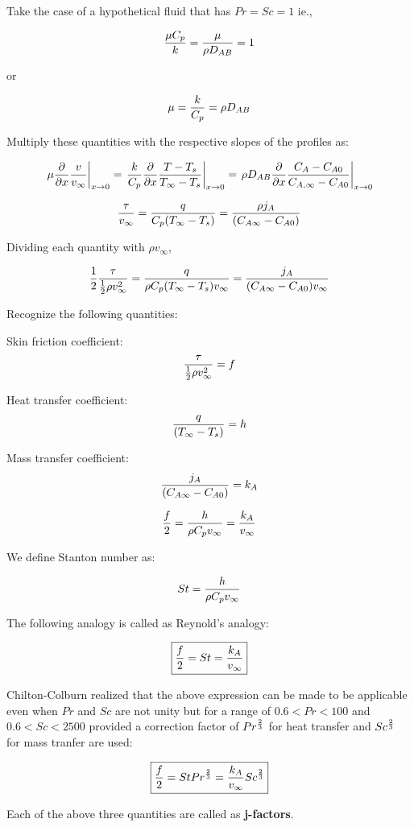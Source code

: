 Take the case of a hypothetical fluid that has $Pr=Sc=1$ ie.,

$$ { \mu C_p \over k} = {\mu \over \rho D_{AB} } = 1$$

or

$$ \mu = {k \over C_p} = \rho D_{AB}$$

Multiply these quantities with the respective slopes of the profiles as:

$$ \left. \mu {\partial \over \partial x} {v \over v_\infty} \right|_{x
\rightarrow 0} = \left. {k \over C_p} {\partial \over \partial x} {T - T_s \over
T_\infty - T_s}\right|_{x \rightarrow 0} = \left. \rho D_{AB} {\partial \over
\partial x} {C_A - C_{A0} \over C_{A,\infty} - C_{A0}}\right|_{x \rightarrow 0}
$$

$$ {\tau \over v_\infty} = {q \over C_p(T_\infty - T_s)} = {\rho j_A \over
(C_{A\infty} - C_{A0})} $$

Dividing each quantity with $\rho v_\infty$, 

$$ {1 \over 2} {\tau \over {1 \over 2} \rho v^2_\infty} = {q \over \rho C_p
(T_\infty - T_s) v_{\infty}} = {j_A \over (C_{A\infty} - C_{A0}) v_\infty} $$

Recognize the following quantities:

Skin friction coefficient: 
$$ {\tau \over { {1 \over 2} \rho v^2_\infty}} = f$$

Heat transfer coefficient:
$$ {q \over (T_\infty - T_s)} = h$$

Mass transfer coefficient:
$${j_A \over (C_{A\infty} - C_{A0})} = k_A$$

$$ {f \over 2} = {h \over \rho C_p v_\infty} = {k_A \over v_\infty}$$

We define Stanton number as:

$$St = {h \over \rho C_p v_\infty}$$

The following analogy is called as Reynold's analogy:

$$ \boxed{
{f \over 2} = St = {k_A \over v_\infty}
}$$

Chilton-Colburn realized that the above expression can be made to be applicable
even when $Pr$ and $Sc$ are not unity but for a range of $0.6 < Pr < 100$ and
$0.6 < Sc < 2500 $ provided a correction factor of $Pr^{2 \over 3}$ for heat
transfer and $Sc^{2 \over 3}$ for mass tranfer are used:

$$ \boxed{
{f \over 2} = St Pr^{2 \over 3} = {k_A \over v_\infty} Sc^{2 \over 3}
}$$

Each of the above three quantities are called as \textbf{j-factors}.

